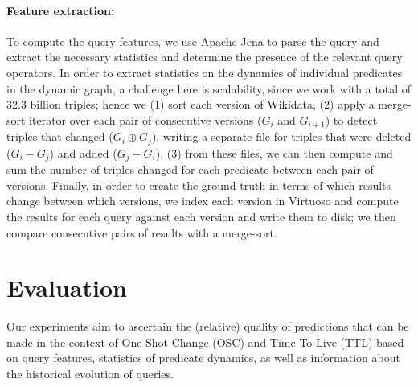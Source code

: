 \documentclass[runningheads]{llncs}
\begin{document}
\paragraph{Feature extraction:} To compute the query features, we use Apache Jena to parse the query and extract the necessary statistics and determine the presence of the relevant query operators. In order to extract statistics on the dynamics of individual predicates in the dynamic graph, a challenge here is scalability, since we work with a total of 32.3 billion triples; hence we (1) sort each version of Wikidata, (2) apply a merge-sort iterator over each pair of consecutive versions ($G_i$ and $G_{i+1}$) to detect triples that changed ($G_i \oplus G_j$), writing a separate file for triples that were deleted ($G_i - G_j$) and added ($G_j - G_i$), (3) from these files, we can then compute and sum the number of triples changed for each predicate between each pair of versions. Finally, in order to create the ground truth in terms of which results change between which versions, we index each version in Virtuoso and compute the results for each query against each version and write them to disk; we then compare consecutive pairs of results with a merge-sort.


\section{Evaluation}
\label{sec:eval}

%

Our experiments aim to ascertain the (relative) quality of predictions that can be made in the context of One Shot Change (OSC) and Time To Live (TTL) based on query features, statistics of predicate dynamics, as well as information about the historical evolution of queries.
\end{document}
